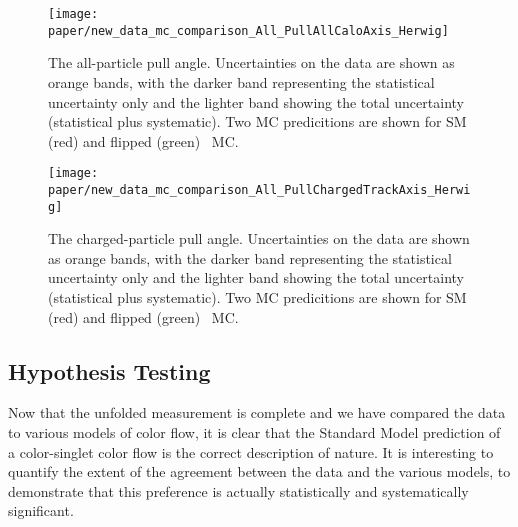 \begin{figure}
  \centering
  \texttt{[image: paper/new\_data\_mc\_comparison\_All\_PullAllCaloAxis\_Herwig]}
  \caption{The all-particle pull angle.
    Uncertainties on the data are shown as orange bands, with the darker band
    representing the statistical uncertainty only and the lighter band
    showing the total uncertainty (statistical plus systematic). Two MC predicitions
    are shown for SM (red) and flipped (green) \PowHerwig\ MC.}
  \label{fig:color:unfolding:final_PullAllCaloAxis_Herwig}
\end{figure}




\begin{figure}
  \centering
  \texttt{[image: paper/new\_data\_mc\_comparison\_All\_PullChargedTrackAxis\_Herwig]}
  \caption{The charged-particle pull angle.
    Uncertainties on the data are shown as orange bands, with the darker band
    representing the statistical uncertainty only and the lighter band
    showing the total uncertainty (statistical plus systematic). Two MC predicitions
    are shown for SM (red) and flipped (green) \PowHerwig\ MC.}
  \label{fig:color:unfolding:final_PullChargedTrackAxis_Herwig}
\end{figure}






	\subsection{Hypothesis Testing}

	Now that the unfolded measurement is complete and we have compared the data to various models of color flow, it is clear that the Standard Model prediction of a color-singlet color flow is the correct description of nature. It is interesting to quantify the extent of the agreement between the data and the various models, to demonstrate that this preference is actually statistically and systematically significant.

